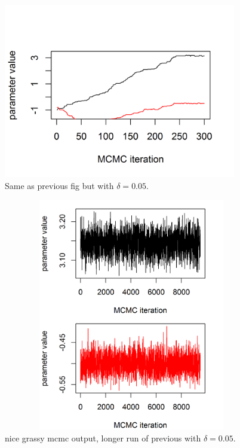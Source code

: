 \begin{figure}
\begin{center}
\includegraphics[height=3in,width=4in]{Ch2/figs/poissonmcmc2}
\end{center}
\caption{Same as previous fig but with $\delta = 0.05$.}
\label{glms.fig.poissonmcmc2}
\end{figure}

\begin{figure}
\begin{center}
\includegraphics[height=4in,width=5in]{Ch2/figs/poissonmcmc3}
\end{center}
\caption{nice grassy mcmc output, longer run of previous with $\delta
  = 0.05$.}
\label{glms.fig.grassy}
\end{figure}

